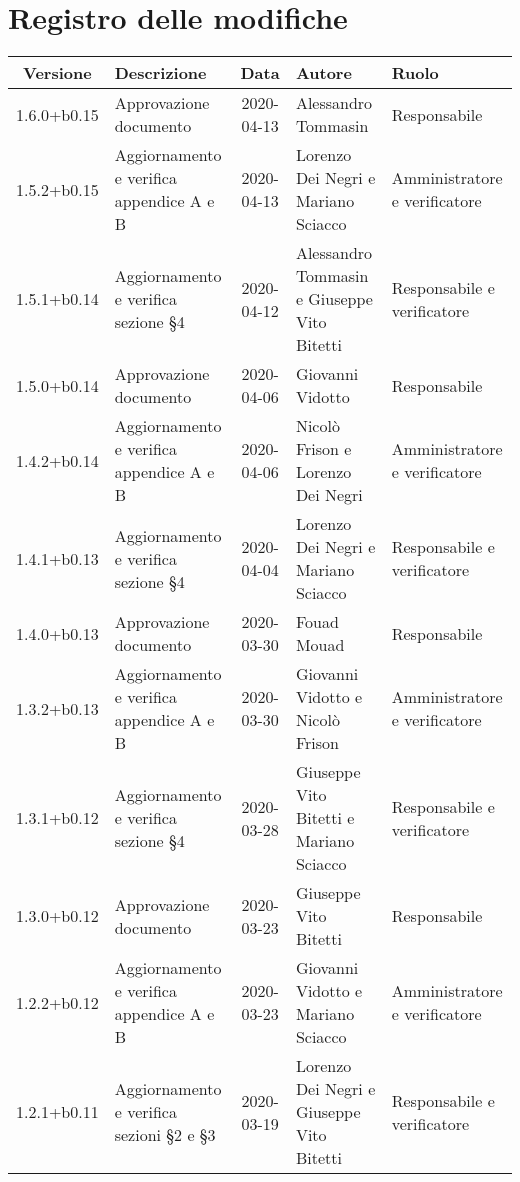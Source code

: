 \section*{Registro delle modifiche}

\begin{center}
	\begin{longtable}{|c|p{3.5cm}|c|p{3cm}|p{3cm}|}
	\hline
	\rowcolor{lighter-grayer}
	\textbf{Versione} & \textbf{Descrizione} & \textbf{Data} & \textbf{Autore} & \textbf{Ruolo} \\
	\hline
	\endfirsthead

	1.6.0+b0.15 & Approvazione documento & 2020-04-13 & Alessandro Tommasin & Responsabile \\
	\hline
	1.5.2+b0.15 & Aggiornamento e verifica appendice A e B & 2020-04-13 & Lorenzo Dei Negri e Mariano Sciacco & Amministratore e verificatore \\
	\hline
	1.5.1+b0.14 & Aggiornamento e verifica sezione \S4 & 2020-04-12 & Alessandro Tommasin e Giuseppe Vito Bitetti & Responsabile e verificatore \\
	\hline
	
	1.5.0+b0.14 & Approvazione documento & 2020-04-06 & Giovanni Vidotto & Responsabile \\
	\hline
	1.4.2+b0.14 & Aggiornamento e verifica appendice A e B & 2020-04-06 & Nicolò Frison e Lorenzo Dei Negri & Amministratore e verificatore \\
	\hline
	1.4.1+b0.13 & Aggiornamento e verifica sezione \S4 & 2020-04-04 & Lorenzo Dei Negri e Mariano Sciacco & Responsabile e verificatore \\
	\hline
	
	1.4.0+b0.13 & Approvazione documento & 2020-03-30 & Fouad Mouad & Responsabile \\
	\hline
	1.3.2+b0.13 & Aggiornamento e verifica appendice A e B & 2020-03-30 & Giovanni Vidotto e Nicolò Frison & Amministratore e verificatore \\
	\hline
	1.3.1+b0.12 & Aggiornamento e verifica sezione \S4 & 2020-03-28 & Giuseppe Vito Bitetti e Mariano Sciacco & Responsabile e verificatore \\
	\hline
	
	1.3.0+b0.12 & Approvazione documento & 2020-03-23 & Giuseppe Vito Bitetti & Responsabile \\
	\hline
	1.2.2+b0.12 & Aggiornamento e verifica appendice A e B & 2020-03-23 & Giovanni Vidotto e Mariano Sciacco & Amministratore e verificatore \\
	\hline
	1.2.1+b0.11 & Aggiornamento e verifica sezioni \S2 e \S3 & 2020-03-19 & Lorenzo Dei Negri e Giuseppe Vito Bitetti & Responsabile e verificatore \\
	\hline
	

\end{longtable}
\end{center}
